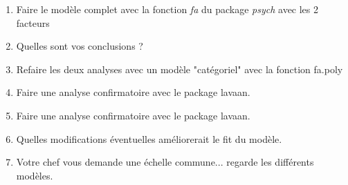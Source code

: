 \documentclass{article}\usepackage[]{graphicx}\usepackage[]{color}
\begin{document}
\begin{enumerate}
  \item Faire le modèle complet avec la fonction \emph{fa} du package \emph{psych} avec les 2 facteurs





\item Quelles sont vos conclusions ?

\item Refaire les deux analyses avec un modèle "catégoriel" avec la fonction fa.poly

\item Faire une analyse confirmatoire avec le package lavaan.




\item Faire une analyse confirmatoire avec le package lavaan.


\item Quelles modifications éventuelles améliorerait le fit du modèle.


\item Votre chef vous demande une échelle commune... regarde les différents modèles.








\end{enumerate}
\end{document}
